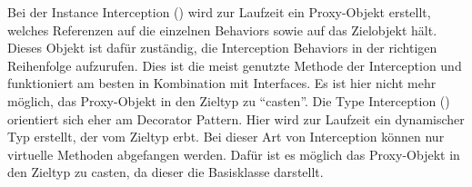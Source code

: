 Bei der Instance Interception () wird zur Laufzeit ein Proxy-Objekt erstellt, welches Referenzen auf die einzelnen Behaviors sowie auf das Zielobjekt hält. Dieses Objekt ist dafür zuständig, die Interception Behaviors in der richtigen Reihenfolge aufzurufen. Dies ist die meist genutzte Methode der Interception und funktioniert am besten in Kombination mit Interfaces. Es ist hier nicht mehr möglich, das Proxy-Objekt in den Zieltyp zu \enquote{casten}. Die Type Interception () orientiert sich eher am Decorator Pattern. Hier wird zur Laufzeit ein dynamischer Typ erstellt, der vom Zieltyp erbt. Bei dieser Art von Interception können nur virtuelle Methoden abgefangen werden. Dafür ist es möglich das Proxy-Objekt in den Zieltyp zu casten, da dieser die Basisklasse darstellt.

